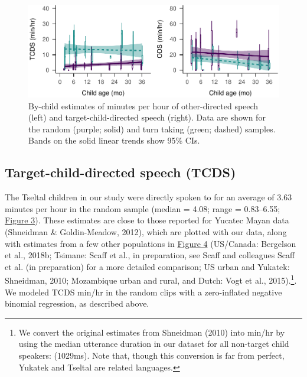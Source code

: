 \documentclass[floatsintext,man]{apa6}
\theoremstyle{definition}
\theoremstyle{definition}
\theoremstyle{definition}
\theoremstyle{remark}
\begin{document}
\begin{figure}
\centering
\includegraphics{Tseltal-CLE_files/figure-latex/fig3-1.pdf}
\caption{\label{fig:fig3}By-child estimates of minutes per hour of
other-directed speech (left) and target-child-directed speech (right).
Data are shown for the random (purple; solid) and turn taking (green;
dashed) samples. Bands on the solid linear trends show 95\% CIs.}
\end{figure}

\subsection{Target-child-directed speech
(TCDS)}\label{target-child-directed-speech-tcds}

The Tseltal children in our study were directly spoken to for an average
of 3.63 minutes per hour in the random sample (median = 4.08; range =
0.83--6.55; \protect\hyperlink{fig3}{Figure 3}). These estimates are
close to those reported for Yucatec Mayan data (Shneidman \&
Goldin-Meadow, 2012), which are plotted with our data, along with
estimates from a few other populations in
\protect\hyperlink{fig4}{Figure 4} (US/Canada: Bergelson et al., 2018b;
Tsimane: Scaff et al., in preparation, see Scaff and colleagues Scaff et
al. (in preparation) for a more detailed comparison; US urban and
Yukatek: Shneidman, 2010; Mozambique urban and rural, and Dutch: Vogt et
al., 2015).\footnote{We convert the original estimates from Shneidman
  (2010) into min/hr by using the median utterance duration in our
  dataset for all non-target child speakers: (1029ms). Note that, though
  this conversion is far from perfect, Yukatek and Tseltal are related
  languages.}. We modeled TCDS min/hr in the random clips with a
zero-inflated negative binomial regression, as described above.
\end{document}
